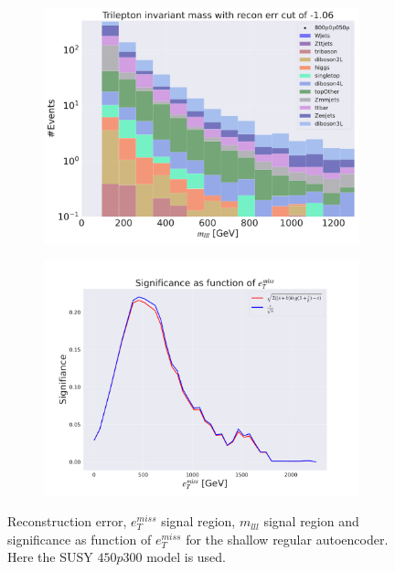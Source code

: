 \begin{figure}[H]
    \hfill
    \begin{subfigure}{.40\textwidth}
        \includegraphics[width=\textwidth]{Figures/AE_testing/small/3lep/b_data_recon_big_rm3_feats_sig_800p0p050p_mlll_recon_errcut_-1.06.pdf}
        \caption{}
        \label{fig:AE_3lep_small_mlll_800_2}
    \end{subfigure}
    \hfill   
    \begin{subfigure}{.40\textwidth}
        \includegraphics[width=\textwidth]{Figures/AE_testing/small/3lep/significance_etmiss_800p0p050p_-1.0567039801896674.pdf}
        \caption{}
        \label{fig:AE_3lep_small_signi_800_2}
    \end{subfigure}
    \hfill      
    \caption[3lep shallow network | $800p50$ | AE | 2]{Reconstruction error, $e_T^{miss}$ signal region, $m_{lll}$ signal region and significance as function of 
    $e_T^{miss}$ for the shallow regular autoencoder. Here the SUSY $450p300$ model is used.}
    \label{fig:AE_3lep_small_rec_sig_signi_800_2}
\end{figure}












